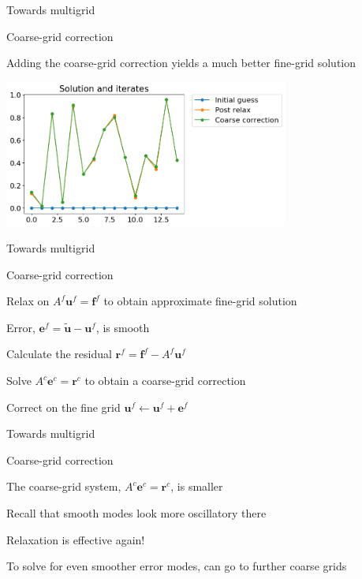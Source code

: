 \documentclass[18pt,xcolor=table]{beamer}
\begin{document}
\begin{frame}{Towards multigrid}
\begin{block}{Coarse-grid correction}
\bit
\item Adding the coarse-grid correction yields a much better fine-grid solution
\eit
\end{block}
\begin{center}
\includegraphics[width=0.7\textwidth]{../figures/solnCoarseCorrect}
\end{center}
\end{frame}

\begin{frame}{Towards multigrid}
\begin{block}{Coarse-grid correction}
\bit
\item Relax on $A^f\mathbf{u}^f = \mathbf{f}^f$ to obtain approximate fine-grid solution
\item Error, $\mathbf{e}^f = \mathbf{\tilde u} - \mathbf{u}^f$, is smooth
\item Calculate the residual $\mathbf{r}^f = \mathbf{f}^f - A^f\mathbf{u}^f$
\item Solve $A^c\mathbf{e}^c = \mathbf{r}^c$ to obtain a coarse-grid correction
\item Correct on the fine grid $\mathbf{u}^f \leftarrow \mathbf{u}^f + \mathbf{e}^f$
\eit
\end{block}
\end{frame}

\begin{frame}{Towards multigrid}
\begin{block}{Coarse-grid correction}
\bit
\item The coarse-grid system, $A^c\mathbf{e}^c = \mathbf{r}^c$, is smaller
\item Recall that smooth modes look more oscillatory there
\item Relaxation is effective again!
\item To solve for even smoother error modes, can go to further coarse grids
\eit
\end{block}
\end{frame}
\end{document}
